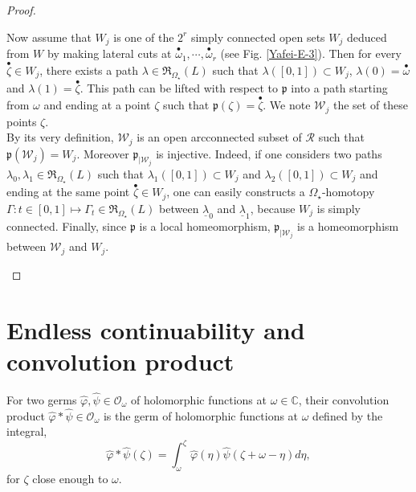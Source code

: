 \documentclass[11pt, english]{smfart}
\theoremstyle{definition}
\begin{document}
\begin{proof}
\begin{enumerate}
Now assume that $W_j$ is one of the  $2^r$ simply connected open sets
$W_j$ deduced  from $W$ by making lateral cuts at ${ {\stackrel{\bullet}{\omega}} }_1,  \cdots,
{ {\stackrel{\bullet}{\omega}} }_r$ (see Fig. \ref{Yafei-E-3}). 
Then for every ${ {\stackrel{\bullet}{\zeta}} } \in W_j$, there exists a path $\lambda \in
\mathfrak{R}_{\Omega_\star}(L)$ such that $\lambda([0,1]) \subset
W_j$, $\lambda(0) = { {\stackrel{\bullet}{\omega}} }$  and $\lambda(1) = { {\stackrel{\bullet}{\zeta}} }$. This path can
be lifted with respect
to $\mathfrak{p}$ into a path starting from $\omega$ and ending at a point $\zeta$
such that $\mathfrak{p}(\zeta) = { {\stackrel{\bullet}{\zeta}} }$.  We note $\mathcal{W}_j$ the set of  these
points $\zeta$.\\
By its very definition, $\mathcal{W}_j$ is an open arcconnected subset of
$\mathscr{R}$ such that $\mathfrak{p}
(\mathcal{W}_j ) = W_j$. Moreover $\mathfrak{p}_{|\mathcal{W}_j}$ is
injective. Indeed, if one considers two paths $\lambda_0, \lambda_1 \in
\mathfrak{R}_{\Omega_\star}(L)$ such that $\lambda_1([0,1]) \subset
W_j$ and  $\lambda_2([0,1]) \subset
W_j$ and ending at the same point ${ {\stackrel{\bullet}{\zeta}} } \in W_j$, 
one can easily constructs a $\Omega_\star$-homotopy ${\Gamma : t \in [0,1]
\mapsto \Gamma_t \in \mathfrak{R}_{\Omega_\star}(L)}$ between
$\underline{\lambda}_0$ and $\underline{\lambda}_1$, because $W_j$ is simply connected.
Finally,  since
$\mathfrak{p}$ is a local homeomorphism,   $\mathfrak{p}_{|\mathcal{W}_j}$ is a
homeomorphism between $\mathcal{W}_j$ and $W_j$.
\end{enumerate}
\end{proof}

\section{Endless continuability and convolution
  product}\label{mainsectionend}

For two germs $\widehat{\varphi}, \widehat{\psi} \in \mathcal{O}_\omega$ of holomorphic
functions at $\omega \in \mathbb{C}$, their convolution product
$\widehat{\varphi} \ast \widehat{\psi} \in \mathcal{O}_\omega$ is the germ of holomorphic
functions  at  $\omega$ defined  by the integral,
\begin{equation}\label{conprod1}
\widehat{\varphi} \ast \widehat{\psi} (\zeta) = \int_\omega^\zeta
\widehat{\varphi}(\eta)  \widehat{\psi}(\zeta+\omega-\eta) d\eta,
\end{equation}
for $\zeta$ close enough to $\omega$. 
\end{document}
